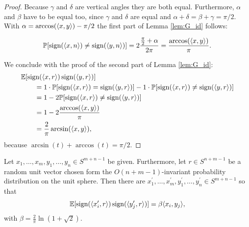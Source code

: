 \begin{proof}
\begin{minipage}{\textwidth}
			\hspace{12pt} Because $\gamma$ and $\delta$ are vertical angles they are both equal. Furthermore, $\alpha$ and $\beta$ have to be equal too, since $\gamma$ and $\delta$ are equal and $\alpha+\delta = \beta+\gamma = \pi/2$. With $\alpha = \arccos(\langle{x},{y}\rangle) - \pi/2$ the first part of Lemma \ref{lem:G_id} follows:
		\end{minipage}
		\begin{align*}
			\mathbb{P}[\operatorname{sign}(\langle{x},{n}\rangle)\neq\operatorname{sign}(\langle{y},{n}\rangle)]=2\frac{\frac{\pi}{2}+\alpha}{2\pi} = \frac{\arccos(\langle{x},{y}\rangle)}{\pi}.
		\end{align*}
		
		\noindent We conclude with the proof of the second part of Lemma \ref{lem:G_id}: 
		\begin{align*}
			&\mathbb{E}[\operatorname{sign}(\langle{x},{r}\rangle) \operatorname{sign}(\langle{y},{r}\rangle)] \\
			&\qquad= 1\cdot\mathbb{P}[\operatorname{sign}(\langle{x},{r}\rangle) = \operatorname{sign} (\langle{y},{r}\rangle )] - 1\cdot \mathbb{P}[\operatorname{sign}(\langle{x},{r}\rangle) \neq \operatorname{sign}(\langle{y},{r}\rangle)] \\
			&\qquad= 1 - 2\mathbb{P}[\operatorname{sign}(\langle{x},{r}\rangle) \neq \operatorname{sign}(\langle{y},{r}\rangle)] \\
			&\qquad= 1 - 2 \frac{\arccos(\langle{x},{y}\rangle)}{\pi} \\
			&\qquad= \frac{2}{\pi} \arcsin(\langle{x},{y}\rangle),
		\end{align*}
		because $\arcsin (t) + \arccos(t) = \pi/2$.
	\end{proof}
	
	\begin{lemma}\label{lem:krivines_trick}
		Let $x_1,\dots,x_m,y_1,\dots,y_n\in S^{m+n-1}$ be given. Furthermore, let $r\in S^{n+m-1}$ be a random unit vector chosen form the $O(n+m-1)$-invariant probability distribution on the unit sphere. Then there are $x_1^\prime,\dots,x_m^\prime, y_1^\prime,\dots,y_n^\prime\in S^{m+n-1}$ so that
		\begin{equation}
			\mathbb{E}[\operatorname{sign}(\langle{x_i^\prime},{r}\rangle)\operatorname{sign}(\langle{y_j^\prime},{r}\rangle)] = \beta \langle{x_i},{y_j}\rangle,
			\label{eq:krivines_trick}
		\end{equation}		
		with $\beta = \frac{2}{\pi} \ln (1+\sqrt{2}).$
	\end{lemma}
	
